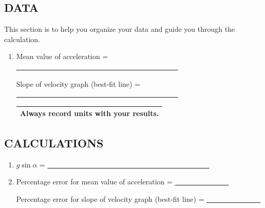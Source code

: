 \subsection*{DATA}

This section is to help you organize your data and guide you through the calculation.

\begin{enumerate}[label=\arabic*.]

\item Mean value of acceleration = \ul{~~~~~~~~~~~~~~~~~~~~~~~~~~~~~~~~~~~~~~~~~~~~~}

Slope of velocity graph (best-fit line) = \ul{~~~~~~~~~~~~~~~~~~~~~~~~~~~~~~~~~~~~~~~~~~~~~}


\begin{center}
\begin{tabular}{|p{14cm}|}
\hline\tstrut
Always record units with your results.  \bstrut\\
\hline
\end{tabular}
\end{center}

\end{enumerate}

\subsection*{CALCULATIONS}

\begin{enumerate}[start=2]

\item \(g\sin\alpha\) = \ul{~~~~~~~~~~~~~~~~~~~~~~~~~~~~~~~~~~~~~~~~~~~~~}

\item  Percentage error for mean value of acceleration = \ul{~~~~~~~~~~~~~~~}

Percentage error for slope of velocity graph (best-fit line) = \ul{~~~~~~~~~~~~~~~}

\end{enumerate}

